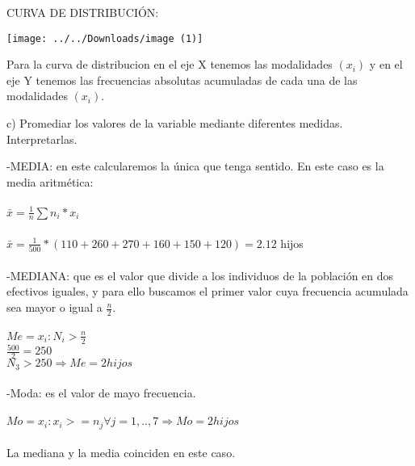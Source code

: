 \begin{center}

CURVA DE DISTRIBUCIÓN:
\begin{center}
	\texttt{[image: ../../Downloads/image (1)]}
\end{center}
Para la curva de distribucion en el eje X tenemos las modalidades $(x_{i})$ y en el eje Y tenemos las frecuencias absolutas acumuladas de cada una de las modalidades $(x_{i})$. 
\end{center}
	 \begin{flushleft}
c) Promediar los valores de la variable mediante diferentes medidas. Interpretarlas.
\end{flushleft}
-MEDIA: en este calcularemos la única que tenga sentido. En este caso es la media aritmética: 
\\
\\
$\bar{x} = \frac{1}{n}  \sum   n_{i} * x_{i}$ 
\\
\\
$\bar{x} = \frac{1}{500} * (110 + 260 +270 + 160 + 150 + 120) = 2.12 $ hijos
\\
\\
-MEDIANA: que es el valor que divide a los individuos de la población en dos efectivos iguales, y para ello buscamos el primer valor cuya frecuencia acumulada sea mayor o igual a $\frac{n}{2}$.
\\
\\
$Me = x_{i} : N_{i} > \frac{n}{2}$
\\

$\frac{500}{2} = 250$ 
\\

$N_{3} > 250  \Rightarrow Me = 2 hijos  $
\\
\\
-Moda: es el valor de mayo frecuencia.
\\
\\
$Mo = x_{i} :x_{i} >= n_{j} \forall j=1,..,7  \Rightarrow Mo = 2 hijos$
\\
\\
\textrightarrow La mediana y la media coinciden en este caso.
\\
\\